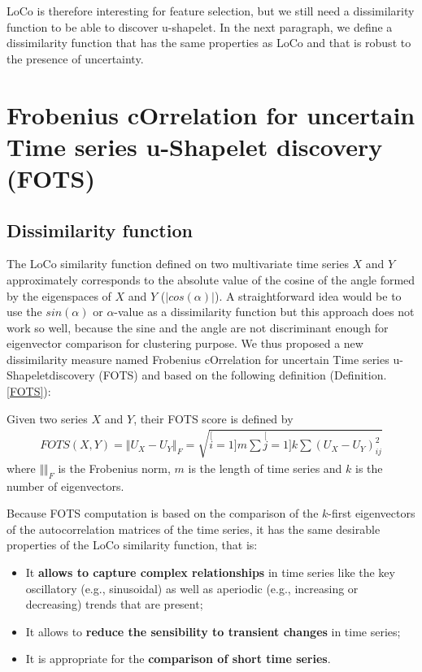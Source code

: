 LoCo is therefore interesting for feature selection, but we still need a dissimilarity
function to be able to discover u-shapelet. In the next paragraph, we 
define a dissimilarity function that has the same properties as LoCo and that is
robust to the presence of uncertainty.





\section{Frobenius cOrrelation for uncertain Time series u-Shapelet discovery (FOTS)}
\subsection{Dissimilarity function}

The LoCo similarity function defined on two multivariate time series $X$ and $Y$ approximately corresponds  to the absolute value of the cosine of the angle formed by the eigenspaces of $X$ and $Y$ ($|cos(\alpha)|$). A straightforward idea would be to use the $sin(\alpha)$ or $\alpha$-value as a dissimilarity function but this approach does not work so well, because the sine and the angle are not discriminant enough for eigenvector comparison for clustering purpose. We thus proposed a new dissimilarity measure named Frobenius cOrrelation for uncertain Time series u-Shapeletdiscovery (FOTS) and based on the following definition (Definition. \ref{FOTS}): 


\begin{definition}
\label{FOTS}
 Given two series $X$
and $Y$, their FOTS score is defined by
\begin{eqnarray}
FOTS(X,Y)=\Vert U_{X}-U_{Y}\Vert_{F}
=\sqrt{\stackrel[i=1]{m}{\sum}\stackrel[j=1]{k}{\sum}(U_{X}-U_{Y})_{ij}^{2}}
\end{eqnarray}
where $\Vert\Vert_{F}$ is the Frobenius norm, $m$ is the length of time series and $k$ is the number of eigenvectors.
\end{definition}
 
 Because  FOTS computation is based on the comparison of the $k$-first eigenvectors of the autocorrelation
 matrices of the time series, it has the same desirable properties of the LoCo
 similarity function, that is: 
 
 \begin{itemize}
   \item It \textbf{allows to capture complex relationships}
in time series like the key oscillatory (e.g., sinusoidal) as well as aperiodic (e.g.,
increasing or decreasing) trends that are present;
   \item It allows to \textbf{reduce the sensibility to transient changes} in time
   series;
   \item It is appropriate for the \textbf{comparison of short
   time series}.
 \end{itemize}


